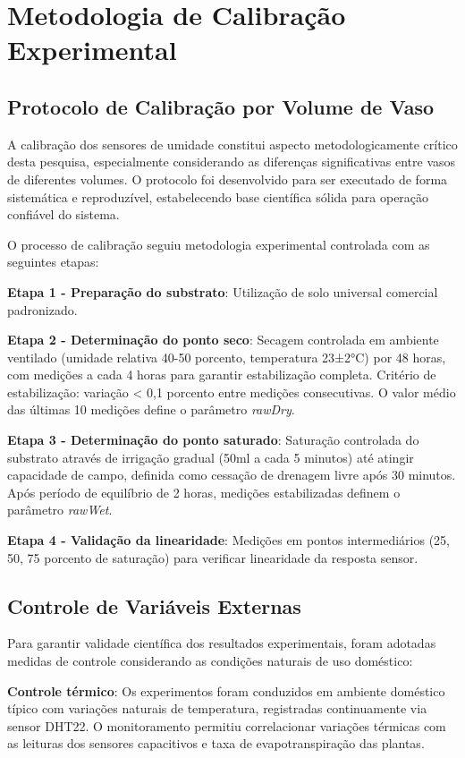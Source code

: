 \documentclass[twoside,english,brazilian]{UNISINOSmonografia}
\begin{document}
\section{Metodologia de Calibração Experimental}

\subsection{Protocolo de Calibração por Volume de Vaso}

A calibração dos sensores de umidade constitui aspecto metodologicamente crítico desta pesquisa, especialmente considerando as diferenças significativas entre vasos de diferentes volumes. O protocolo foi desenvolvido para ser executado de forma sistemática e reproduzível, estabelecendo base científica sólida para operação confiável do sistema.

O processo de calibração seguiu metodologia experimental controlada com as seguintes etapas:

\textbf{Etapa 1 - Preparação do substrato}: Utilização de solo universal comercial padronizado.

\textbf{Etapa 2 - Determinação do ponto seco}: Secagem controlada em ambiente ventilado (umidade relativa 40-50 porcento, temperatura 23±2°C) por 48 horas, com medições a cada 4 horas para garantir estabilização completa. Critério de estabilização: variação < 0,1 porcento entre medições consecutivas. O valor médio das últimas 10 medições define o parâmetro \textit{rawDry}.

\textbf{Etapa 3 - Determinação do ponto saturado}: Saturação controlada do substrato através de irrigação gradual (50ml a cada 5 minutos) até atingir capacidade de campo, definida como cessação de drenagem livre após 30 minutos. Após período de equilíbrio de 2 horas, medições estabilizadas definem o parâmetro \textit{rawWet}.

\textbf{Etapa 4 - Validação da linearidade}: Medições em pontos intermediários (25, 50, 75 porcento de saturação) para verificar linearidade da resposta sensor.

\subsection{Controle de Variáveis Externas}

Para garantir validade científica dos resultados experimentais, foram adotadas medidas de controle considerando as condições naturais de uso doméstico:

\textbf{Controle térmico}: Os experimentos foram conduzidos em ambiente doméstico típico com variações naturais de temperatura, registradas continuamente via sensor DHT22. O monitoramento permitiu correlacionar variações térmicas com as leituras dos sensores capacitivos e taxa de evapotranspiração das plantas.
\end{document}
